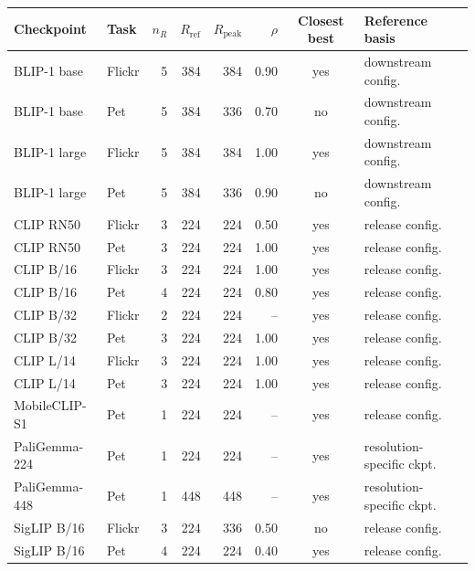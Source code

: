 \begin{tabular}{@{}llrrrrcl@{}}
\hline
Checkpoint & Task & $n_R$ & $R_{\mathrm{ref}}$ & $R_{\mathrm{peak}}$ & $\rho$ & Closest best & Reference basis \\
\hline
BLIP-1 base & Flickr & 5 & 384 & 384 & 0.90 & yes & downstream config. \\
BLIP-1 base & Pet & 5 & 384 & 336 & 0.70 & no & downstream config. \\
BLIP-1 large & Flickr & 5 & 384 & 384 & 1.00 & yes & downstream config. \\
BLIP-1 large & Pet & 5 & 384 & 336 & 0.90 & no & downstream config. \\
CLIP RN50 & Flickr & 3 & 224 & 224 & 0.50 & yes & release config. \\
CLIP RN50 & Pet & 3 & 224 & 224 & 1.00 & yes & release config. \\
CLIP B/16 & Flickr & 3 & 224 & 224 & 1.00 & yes & release config. \\
CLIP B/16 & Pet & 4 & 224 & 224 & 0.80 & yes & release config. \\
CLIP B/32 & Flickr & 2 & 224 & 224 & -- & yes & release config. \\
CLIP B/32 & Pet & 3 & 224 & 224 & 1.00 & yes & release config. \\
CLIP L/14 & Flickr & 3 & 224 & 224 & 1.00 & yes & release config. \\
CLIP L/14 & Pet & 3 & 224 & 224 & 1.00 & yes & release config. \\
MobileCLIP-S1 & Pet & 1 & 224 & 224 & -- & yes & release config. \\
PaliGemma-224 & Pet & 1 & 224 & 224 & -- & yes & resolution-specific ckpt. \\
PaliGemma-448 & Pet & 1 & 448 & 448 & -- & yes & resolution-specific ckpt. \\
SigLIP B/16 & Flickr & 3 & 224 & 336 & 0.50 & no & release config. \\
SigLIP B/16 & Pet & 4 & 224 & 224 & 0.40 & yes & release config. \\
\hline
\end{tabular}
